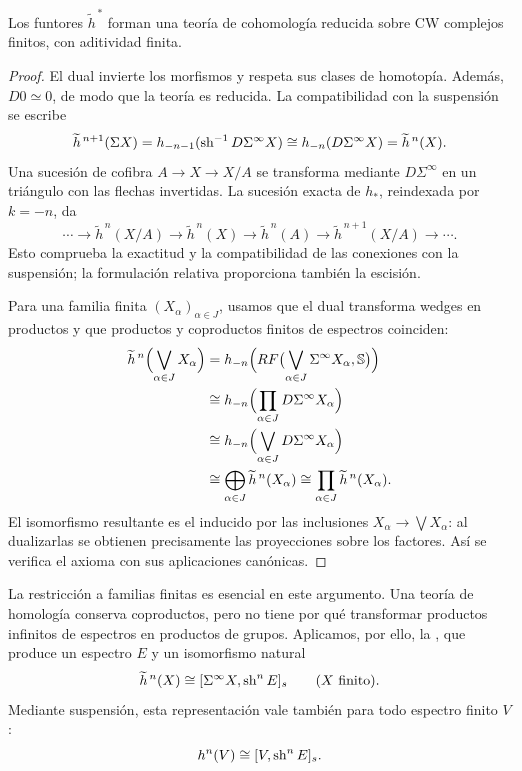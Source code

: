 \begin{prop}\label{prop:c20-dual-cohomologia}
Los funtores $\widetilde h^{\,*}$ forman una teoría de cohomología reducida sobre CW complejos finitos, con aditividad finita.
\end{prop}
\begin{proof}
El dual invierte los morfismos y respeta sus clases de homotopía. Además, $D0\simeq0$, de modo que la teoría es reducida. La compatibilidad con la suspensión se escribe
\[
\widetilde h^{\,n+1}(\Sigma X)
=h_{-n-1}(\operatorname{sh}^{-1}D\Sigma^\infty X)
\cong h_{-n}(D\Sigma^\infty X)
=\widetilde h^{\,n}(X).
\]
Una sucesión de cofibra $A\to X\to X/A$ se transforma mediante $D\Sigma^\infty$ en un triángulo con las flechas invertidas. La sucesión exacta de $h_*$, reindexada por $k=-n$, da
\[
\cdots\longrightarrow\widetilde h^{\,n}(X/A)
\longrightarrow\widetilde h^{\,n}(X)
\longrightarrow\widetilde h^{\,n}(A)
\longrightarrow\widetilde h^{\,n+1}(X/A)\longrightarrow\cdots.
\]
Esto comprueba la exactitud y la compatibilidad de las conexiones con la suspensión; la formulación relativa proporciona también la escisión.

Para una familia finita $(X_\alpha)_{\alpha\in J}$, usamos que el dual transforma wedges en productos y que productos y coproductos finitos de espectros coinciden:
\[
\begin{aligned}
\widetilde h^{\,n}\Bigl(\bigvee_{\alpha\in J}X_\alpha\Bigr)
&=h_{-n}\Bigl(RF\bigl(\bigvee_{\alpha\in J}\Sigma^\infty X_\alpha,\mathbb S\bigr)\Bigr)\\
&\cong h_{-n}\Bigl(\prod_{\alpha\in J}D\Sigma^\infty X_\alpha\Bigr)\\
&\cong h_{-n}\Bigl(\bigvee_{\alpha\in J}D\Sigma^\infty X_\alpha\Bigr)\\
&\cong\bigoplus_{\alpha\in J}\widetilde h^{\,n}(X_\alpha)
\cong\prod_{\alpha\in J}\widetilde h^{\,n}(X_\alpha).
\end{aligned}
\]
El isomorfismo resultante es el inducido por las inclusiones $X_\alpha\to\bigvee X_\alpha$: al dualizarlas se obtienen precisamente las proyecciones sobre los factores. Así se verifica el axioma con sus aplicaciones canónicas.
\end{proof}

La restricción a familias finitas es esencial en este argumento. Una teoría de homología conserva coproductos, pero no tiene por qué transformar productos infinitos de espectros en productos de grupos. Aplicamos, por ello, la , que produce un espectro $E$ y un isomorfismo natural
\[
\widetilde h^{\,n}(X)\cong[\Sigma^\infty X,\operatorname{sh}^nE]_s
\qquad(X\text{ finito}).
\]
Mediante suspensión, esta representación vale también para todo espectro finito $V$:
\[
h^n(V)\cong[V,\operatorname{sh}^nE]_s.
\]

